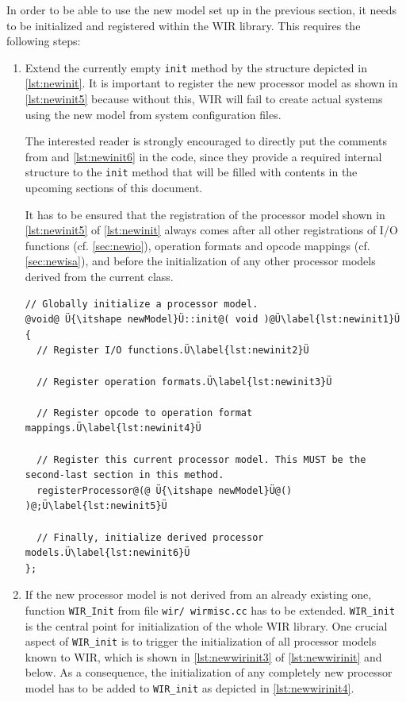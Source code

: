 In order to be able to use the new model set up in the previous section, it needs to be initialized and registered within the \gls{WIR} library.
This requires the following steps:
\begin{enumerate}[resume]
  \item Extend the currently empty \texttt{init} method by the structure depicted in \cref{lst:newinit}.
  It is important to register the new processor model as shown in \cref{lst:newinit5} because without this, \gls{WIR} will fail to create actual systems using the new model from system configuration files.

  The interested reader is strongly encouraged to directly put the comments from  and \cref{lst:newinit6} in the code, since they provide a required internal structure to the \texttt{init} method that will be filled with contents in the upcoming sections of this document.

  \begin{wirWarn}
    It has to be ensured that the registration of the processor model shown in \cref{lst:newinit5} of \cref{lst:newinit} always comes after all other registrations of I/O functions (cf. \cref{sec:newio}), operation formats and opcode mappings (cf. \cref{sec:newisa}), and before the initialization of any other processor models derived from the current class.
  \end{wirWarn}

\begin{lstlisting}[style=code,float=!t,caption={General Structure of a New Processor Model's \texttt{init} Method},label=lst:newinit]
// Globally initialize a processor model.
@void@ Ü{\itshape newModel}Ü::init@( void )@Ü\label{lst:newinit1}Ü
{
  // Register I/O functions.Ü\label{lst:newinit2}Ü

  // Register operation formats.Ü\label{lst:newinit3}Ü

  // Register opcode to operation format mappings.Ü\label{lst:newinit4}Ü

  // Register this current processor model. This MUST be the second-last section in this method.
  registerProcessor@(@ Ü{\itshape newModel}Ü@() )@;Ü\label{lst:newinit5}Ü

  // Finally, initialize derived processor models.Ü\label{lst:newinit6}Ü
};
\end{lstlisting}

  \item If the new processor model is not derived from an already existing one, function \texttt{WIR\_Init} from file \texttt{wir/ wirmisc.cc} has to be extended.
  \texttt{WIR\_init} is the central point for initialization of the whole \gls{WIR} library.
  One crucial aspect of \texttt{WIR\_init} is to trigger the initialization of all processor models known to \gls{WIR}, which is shown in \cref{lst:newwirinit3} of \cref{lst:newwirinit} and below.
  As a consequence, the initialization of any completely new processor model has to be added to \texttt{WIR\_init} as depicted in \cref{lst:newwirinit4}.


\end{enumerate}
